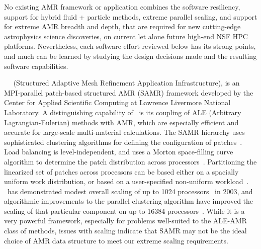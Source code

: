 \documentclass[11pt,letterpaper]{article}
\begin{document}
No existing AMR framework or application combines the software
resiliency, support for hybrid fluid + particle methods, extreme
parallel scaling, and support for extreme AMR breadth and depth, that
are required for new cutting-edge astrophysics science discoveries, on
current let alone future high-end NSF HPC platforms.  Nevertheless,
each software effort reviewed below has its strong points, and much
can be learned by studying the design decisions made and the resulting
software capabilities.


\SUBSUBSECTION{\samrai}
%
\samrai~\cite{WiHo01}~\cite{wwwsamraicode} (Structured Adaptive Mesh
Refinement Application Infrastructure), is an MPI-parallel patch-based
structured AMR (SAMR) framework developed by the Center for Applied
Scientific Computing at Lawrence Livermore National Laboratory.  A
distinguishing capability of \samrai\ is its coupling of ALE
(Arbitrary Lagrangian-Eulerian) methods with AMR, which are especially
efficient and accurate for large-scale multi-material calculations.
The SAMR hierarchy uses sophisticated clustering algorithms for
defining the configuration of patches~\cite{GuWi06}.  Load balancing
is level-independent, and uses a Morton space-filling curve algorithm
to determine the patch distribution across processors~\cite{WiHo01}.
Partitioning the linearized set of patches across processors can be
based either on a spacially uniform work distribution, or based on a
user-specified non-uniform workload~\cite{wwwsamraicode}.  \samrai\
has demonstrated modest overall scaling of up to 1024
processors~\cite{WiHy03} in 2003, and algorithmic improvements to the
parallel clustering algorithm have improved the scaling of that
particular component on up to 16384 processors~\cite{GuWi06}.  While
it is a very powerful framework, especially for problems well-suited
to the ALE-AMR class of methods, issues with scaling indicate that
SAMR may not be the ideal choice of AMR data structure to meet our
extreme scaling requirements.

\end{document}

